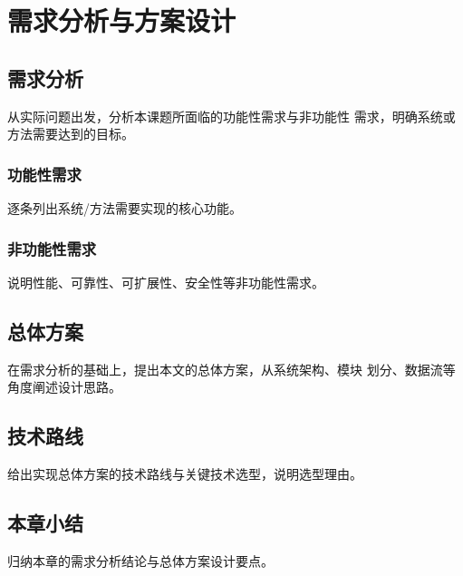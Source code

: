 %

\chapter{需求分析与方案设计}
\label{chap:design}

\section{需求分析}
从实际问题出发，分析本课题所面临的功能性需求与非功能性
需求，明确系统或方法需要达到的目标。

\subsection{功能性需求}
逐条列出系统/方法需要实现的核心功能。

\subsection{非功能性需求}
说明性能、可靠性、可扩展性、安全性等非功能性需求。

\section{总体方案}
在需求分析的基础上，提出本文的总体方案，从系统架构、模块
划分、数据流等角度阐述设计思路。

\section{技术路线}
给出实现总体方案的技术路线与关键技术选型，说明选型理由。

\section{本章小结}
归纳本章的需求分析结论与总体方案设计要点。
